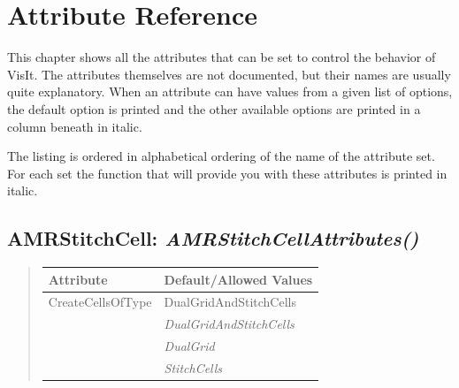 \documentclass[letterpaper,10pt,english]{sphinxmanual}
\begin{document}
\chapter{Attribute Reference}
\label{attributes::doc}\label{attributes:visit}\label{attributes:attribute-reference}
This chapter shows all the attributes that can be set to control the
behavior of VisIt. The attributes themselves are not documented, but
their names are usually quite explanatory. When an attribute can have
values from a given list of options, the default option is printed and
the other available options are printed in a column beneath in italic.

The listing is ordered in alphabetical ordering of the name of the
attribute set. For each set the function that will provide you with
these attributes is printed in italic.

\begin{DUlineblock}{0em}
\item[] 
\item[] 
\item[] 
\end{DUlineblock}

\begin{DUlineblock}{0em}
\item[] 
\end{DUlineblock}


\section{\textbf{AMRStitchCell}: \emph{AMRStitchCellAttributes()}}
\label{attributes:amrstitchcell-amrstitchcellattributes}
\begin{DUlineblock}{0em}
\item[] 
\end{DUlineblock}
\begin{quote}

\begin{tabulary}{\linewidth}{|L|L|}
\hline

\textbf{Attribute}
 & 
\textbf{Default/Allowed Values}
\\
\hline
CreateCellsOfType
 & 
DualGridAndStitchCells
\\
\hline & 
\emph{DualGridAndStitchCells}
\\
\hline & 
\emph{DualGrid}
\\
\hline & 
\emph{StitchCells}
\\
\hline\end{tabulary}

\end{quote}
\end{document}
